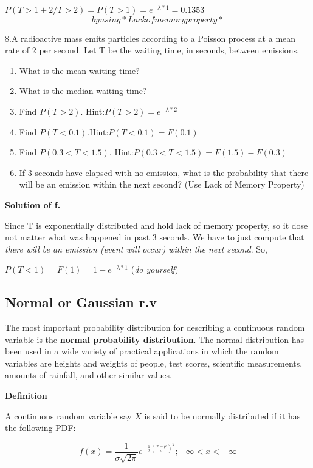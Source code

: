 \documentclass[
]{article}
\providecommand{\tightlist}{%
  \setlength{\itemsep}{0pt}\setlength{\parskip}{0pt}}
\begin{document}
\(P(T>1+2 /T>2)=P(T>1)=e^{-\lambda *1}=0.1353\) \[by using *Lack of memory property*\]

8.A radioactive mass emits particles according to a Poisson process at a mean rate of 2 per second. Let T be the waiting time, in seconds, between emissions.

\begin{enumerate}
\def\labelenumi{\alph{enumi}.}
\tightlist
\item
  What is the mean waiting time?
\item
  What is the median waiting time?
\item
  Find \(P(T > 2)\). Hint:\(P(T > 2)=e^{-\lambda *2}\)
\item
  Find \(P(T < 0.1)\).Hint:\(P(T < 0.1)=F(0.1)\)
\item
  Find \(P(0.3< T < 1.5)\). Hint:\(P(0.3< T < 1.5)=F(1.5)-F(0.3)\)
\item
  If 3 seconds have elapsed with no emission, what is the probability that there will be an emission within the next second? (Use Lack of Memory Property)
\end{enumerate}

\textbf{Solution of f.}

Since T is exponentially distributed and hold lack of memory property, so it dose not matter what was happened in past 3 seconds. We have to just compute that \emph{there will be an emission (event will occur) within the next second}. So,

\(P(T<1)=F(1)=1-e^{-\lambda*1}\) (\emph{do yourself})

\subsection{Normal or Gaussian r.v}\label{normal-or-gaussian-r.v}

The most important probability distribution for describing a continuous random variable is the \textbf{normal probability distribution}. The normal distribution has been used in a wide variety of practical applications in which the random variables are heights and weights of people, test scores, scientific measurements, amounts of rainfall, and other similar values.

\textbf{Definition}

A continuous random variable say \(X\) is said to be normally distributed if it has the following PDF:

\[
f(x)=\frac{1}{\sigma\sqrt{2\pi}}e^{-\frac{1}{2}(\frac{x-\mu}{\sigma})^2}; -\infty<x<+\infty
\]
\end{document}

